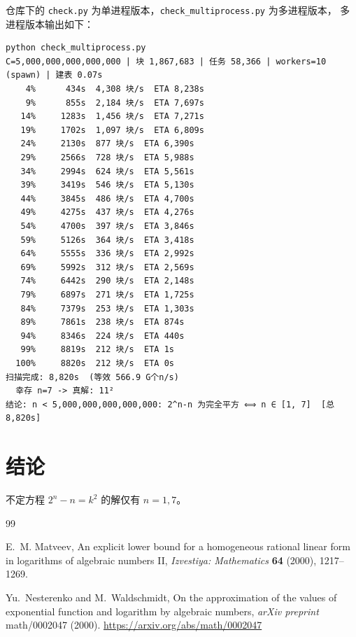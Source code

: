 \documentclass[11pt,a4paper]{ctexart}
\theoremstyle{remark}
\begin{document}
仓库下的 \verb|check.py| 为单进程版本，\verb|check_multiprocess.py| 为多进程版本，
多进程版本输出如下：
\begin{verbatim}
python check_multiprocess.py
C=5,000,000,000,000,000 | 块 1,867,683 | 任务 58,366 | workers=10 (spawn) | 建表 0.07s
    4%      434s  4,308 块/s  ETA 8,238s
    9%      855s  2,184 块/s  ETA 7,697s
   14%     1283s  1,456 块/s  ETA 7,271s
   19%     1702s  1,097 块/s  ETA 6,809s
   24%     2130s  877 块/s  ETA 6,390s
   29%     2566s  728 块/s  ETA 5,988s
   34%     2994s  624 块/s  ETA 5,561s
   39%     3419s  546 块/s  ETA 5,130s
   44%     3845s  486 块/s  ETA 4,700s
   49%     4275s  437 块/s  ETA 4,276s
   54%     4700s  397 块/s  ETA 3,846s
   59%     5126s  364 块/s  ETA 3,418s
   64%     5555s  336 块/s  ETA 2,992s
   69%     5992s  312 块/s  ETA 2,569s
   74%     6442s  290 块/s  ETA 2,148s
   79%     6897s  271 块/s  ETA 1,725s
   84%     7379s  253 块/s  ETA 1,303s
   89%     7861s  238 块/s  ETA 874s
   94%     8346s  224 块/s  ETA 440s
   99%     8819s  212 块/s  ETA 1s
  100%     8820s  212 块/s  ETA 0s
扫描完成: 8,820s  (等效 566.9 G个n/s)
  幸存 n=7 -> 真解: 11²
结论: n < 5,000,000,000,000,000: 2^n-n 为完全平方 ⟺ n ∈ [1, 7]  [总 8,820s]
\end{verbatim}

\section{结论}
不定方程 $2^n-n=k^2$ 的解仅有 $n=1,7$。

\begin{thebibliography}{99}

E.~M. Matveev, An explicit lower bound for a homogeneous rational linear form
in logarithms of algebraic numbers II,
\emph{Izvestiya: Mathematics} \textbf{64} (2000), 1217--1269.

Yu.~Nesterenko and M.~Waldschmidt, On the approximation of the values of
exponential function and logarithm by algebraic numbers,
\emph{arXiv preprint} math/0002047 (2000).
\url{https://arxiv.org/abs/math/0002047}

\end{thebibliography}
\end{document}
